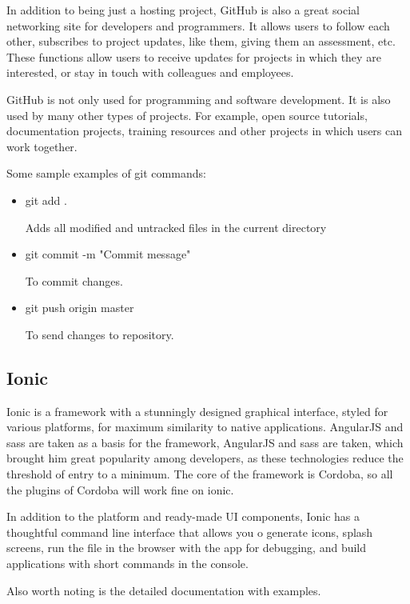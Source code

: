 In addition to being just a hosting project, GitHub is also a great social networking site for developers and programmers. It allows users to follow each other, subscribes to project updates, like them, giving them an assessment, etc. These functions allow users to receive updates for projects in which they are interested, or stay in touch with colleagues and employees.\par

GitHub is not only used for programming and software development. It is also used by many other types of projects. For example, open source tutorials, documentation projects, training resources and other projects in which users can work together.\cite{GitHub}\par

Some sample examples of git commands:
\begin{itemize}

    \item git add .\par
    Adds all modified and untracked files in the current directory
    
    \item git commit -m "Commit message"\par
    To commit changes.
    
    \item git push origin master\par
    To send changes to repository. 
\end{itemize}

\subsection{Ionic}
Ionic is a framework with a stunningly designed graphical interface, styled for various platforms, for maximum similarity to native applications. AngularJS and sass are taken as a basis for the framework, AngularJS and sass are taken, which brought him great popularity among developers, as these technologies reduce the threshold of entry to a minimum. The core of the framework is Cordoba, so all the plugins of Cordoba will work fine on ionic.\par In addition to the platform and ready-made UI components, Ionic has a thoughtful command line interface that allows you o generate icons, splash screens, run the file in the browser with the app for debugging, and build applications with short commands in the console.\par Also worth noting is the detailed documentation with examples.\cite{Ionic}

